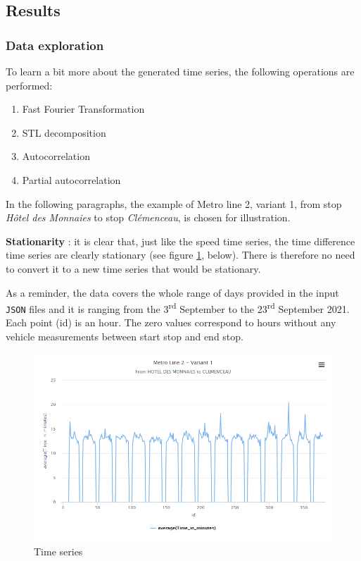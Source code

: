 \documentclass{article}
\begin{document}
\subsection{Results}

\subsubsection{Data exploration}
To learn a bit more about the generated time series, the following operations are performed:
\begin{enumerate}
    \item Fast Fourier Transformation
    \item STL decomposition
    \item Autocorrelation
    \item Partial autocorrelation

\end{enumerate}

In the following paragraphs, the example of Metro line 2, variant 1, from stop \textit{Hôtel des Monnaies} to stop \textit{Clémenceau}, is chosen for illustration.

\textbf{Stationarity}  : it is clear that, just like the speed time series, the time difference time series are clearly stationary (see figure \ref{fig:timeseries}, below). There is therefore no need to convert it to a new time series that would be stationary.

As a reminder, the data covers the whole range of days provided in the input \texttt{JSON} files and it is ranging from the 3\textsuperscript{rd} September to the 23\textsuperscript{rd} September 2021. Each point (id) is an hour. The zero values correspond to hours without any vehicle measurements between start stop and end stop.

 \begin{figure}[H]
    \centering
    \includegraphics[width=\textwidth]{images/Fig1.png} 
    \caption{Time series}
    \label{fig:timeseries}
\end{figure}
\end{document}
